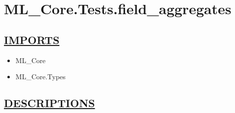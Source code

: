 \chapter*{ML\_Core.Tests.field\_aggregates}
\hypertarget{ecldoc:toc:ML_Core.Tests.field_aggregates}{}

\section*{\underline{IMPORTS}}
\begin{itemize}
\item ML\_Core
\item ML\_Core.Types
\end{itemize}

\section*{\underline{DESCRIPTIONS}}
